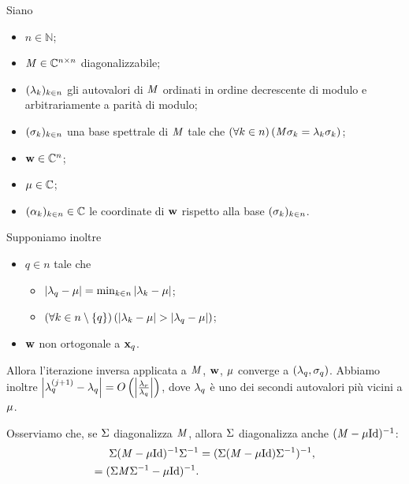 \begin{Theorem}
  Siano
  \begin{itemize}
    \item $n \in \mathbb{N}$;
    \item $\mathit{M} \in \mathbb{C}^{n \times n}$ diagonalizzabile;
    \item $(\lambda_k)_{k \in n}$ gli autovalori di $\mathit{M}$ ordinati in ordine
      decrescente di modulo e arbitrariamente a parit\`a di modulo;
    \item $(\sigma_k)_{k \in n}$ una base spettrale di $\mathit{M}$ tale
      che $\left ( \forall k \in n \right ) \left ( \mathit{M} \sigma_k = \lambda_k \sigma_k \right )$;
    \item $\mathbf{w} \in \mathbb{C}^n$;
    \item $\mu \in \mathbb{C}$;
    \item $(\alpha_k)_{k \in n} \in \mathbb{C}$ le coordinate di $\mathbf{w}$
      rispetto alla base $(\sigma_k)_{k \in n}$.
  \end{itemize}
  Supponiamo inoltre
  \begin{itemize}
    \item $q \in n$ tale che
    \begin{itemize}
      \item $\left \lvert \lambda_q - \mu \right \rvert
            = \min_{k \in n} \left \lvert \lambda_k - \mu \right \rvert$;
      \item $\left ( \forall k \in n \setminus \lbrace q \rbrace \right ) \left ( 
              \left \lvert \lambda_k - \mu \right \rvert >
              \left \lvert \lambda_q - \mu \right \rvert \right )$;
    \end{itemize}
    \item $\mathbf{w}$ non ortogonale a $\Eigenvector_q$.
  \end{itemize}
  Allora l'iterazione inversa applicata a
  $\mathit{M}$, $\mathbf{w}$, $\mu$
  converge a $(\lambda_q,\sigma_q)$.
  Abbiamo inoltre
  $\left \lvert \lambda_q^{(j + 1)} - \lambda_q \right \rvert
  = O \left ( \left \lvert \frac{\lambda_r}{\lambda_q} \right \rvert \right )$,
  dove $\lambda_q$ \`e uno dei secondi autovalori pi\`u vicini
  a $\mu$.
\end{Theorem}
\Proof Osserviamo che, se $\Sigma$ diagonalizza
$\mathit{M}$, allora $\Sigma$ diagonalizza anche
$(\Matrix - \VarEigenvalue\Identity)^{-1}$:
\begin{align*}
  \SpectralBaseChange
  (\Matrix - \VarEigenvalue\Identity)^{-1}
  \SpectralBaseChange^{-1}
  &= (\SpectralBaseChange
  (\Matrix - \VarEigenvalue\Identity)
  \SpectralBaseChange^{-1})^{-1},\\
  = (\SpectralBaseChange\Matrix\SpectralBaseChange^{-1}
  - \VarEigenvalue\Identity)^{-1}.
\end{align*}
